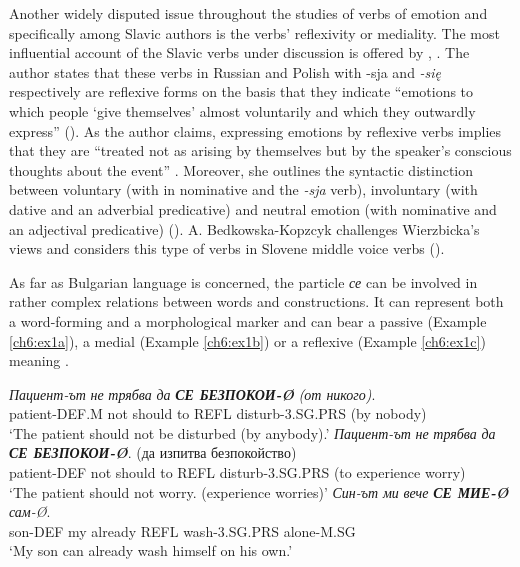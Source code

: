 \documentclass[output=paper,colorlinks,citecolor=brown]{langscibook}
\begin{document}
Another widely disputed issue throughout the studies of verbs of emotion and specifically among Slavic authors is the verbs’ reflexivity or mediality. The most influential account of the Slavic verbs under discussion is offered by \citet{wierzbicka1988semantics}, \citet{wierzbicka1995everyday}. The author states that these verbs in Russian and Polish with -sja and \textit{-się} respectively are reflexive forms on the basis that they indicate ``emotions to which people `give themselves' almost voluntarily and which they outwardly express'' (\cite[253]{wierzbicka1988semantics}). As the author claims, expressing emotions by reflexive verbs implies that they are ``treated not as arising by themselves but by the speaker’s conscious thoughts about the event'' \citep[22]{wierzbicka1995everyday}. Moreover, she outlines the syntactic distinction between voluntary (with  in nominative and the \textit{-sja} verb), involuntary (with dative  and an adverbial predicative) and neutral emotion (with nominative  and an adjectival predicative) (\cite[253--254]{wierzbicka1988semantics}). A. Bedkowska-Kopzcyk challenges Wierzbicka’s views and considers this type of verbs in Slovene middle voice verbs (\cite{bkedkowska2014verbs}).


As far as Bulgarian language is concerned, the particle \textit{се} can be involved in rather complex relations between words and constructions. It can represent both a word-forming and a morphological marker and can bear a passive (Example \ref{ch6:ex1a}), a medial (Example \ref{ch6:ex1b}) or a reflexive (Example \ref{ch6:ex1c}) meaning \citep[100--103]{tisheva2022положителни}. 

\begin{exe} 
\ex  \label{ch6:ex1} 
\begin{xlist}
\ex \label{ch6:ex1a} 
\gll
\textit{Пациент-ът} \textit{не} \textit{трябва} \textit{да} \textit{\uppercase{\textbf{се безпокои-Ø}}} \textit{(от никого)}. \\
patient-DEF.M not should to {REFL disturb-3.SG.PRS} {(by nobody)}\\
\glt `The patient should not be disturbed (by anybody).' 
\ex \label{ch6:ex1b} 
\gll
\textit{Пациент-ът} \textit{не} \textit{трябва} \textit{да} \textit{\uppercase{\textbf{се безпокои-Ø}}}. {(да изпитва безпокойство)} \\
patient-DEF not should to {REFL disturb-3.SG.PRS} {(to experience worry)}\\
\glt `The patient should not worry. (experience worries)'
\ex \label{ch6:ex1c} 
\gll
\textit{Син-ът} \textit{ми} \textit{вече} \textit{\uppercase{\textbf{се МИЕ-Ø}}} \textit{сам-Ø}. \\
son-DEF my already {REFL wash-3.SG.PRS} alone-M.SG\\
\glt `My son can already wash himself on his own.'
\end{xlist}
\end{exe}
\end{document}
